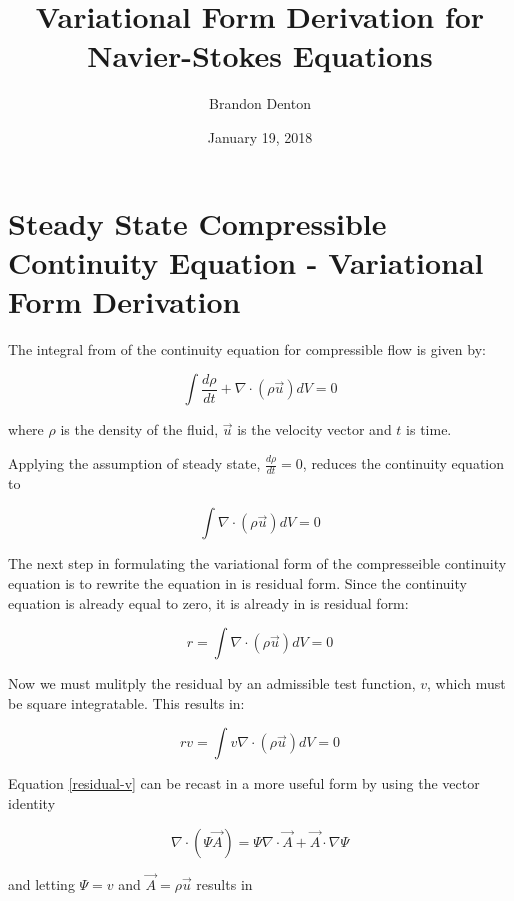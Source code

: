 \documentclass{article}
\begin{document}
\title{Variational Form Derivation for Navier-Stokes Equations}
\author{Brandon Denton}
\date{January 19, 2018}

\section{Steady State Compressible Continuity Equation - Variational Form Derivation}

The integral from of the continuity equation for compressible flow is given by:

\begin{equation} \label{eq1}
\int \frac{d\rho}{dt}  + \nabla \cdot (\rho \vec{u} ) dV = 0
\end{equation}

where $\rho$ is the density of the fluid, $\vec{u}$ is the velocity vector and $t$ is time.

Applying the assumption of steady state, $\frac{d\rho}{dt} = 0$, reduces the continuity equation to

\begin{equation} \label{eq2}
\int \nabla \cdot (\rho \vec{u} ) dV = 0
\end{equation}

The next step in formulating the variational form of the compresseible continuity equation is to 
rewrite the equation in is residual form. Since the continuity equation is already equal to zero,
it is already in is residual form:

\begin{equation} \label{residual}
r = \int \nabla \cdot (\rho \vec{u} ) dV = 0
\end{equation}

Now we must mulitply the residual by an admissible test function, $v$, which must be square integratable.
This results in:

\begin{equation} \label{residual-v}
rv = \int v \nabla \cdot (\rho \vec{u} ) dV = 0
\end{equation}

Equation \ref{residual-v} can be recast in a more useful form by using the vector identity

\begin{equation} \label{vecIdent}
\nabla \cdot (\Psi \vec{A}) = \Psi \nabla \cdot \vec{A} + \vec{A} \cdot \nabla\Psi
\end{equation}

and letting $\Psi = v$ and $\vec{A} = \rho \vec{u}$ results in
\end{document}
